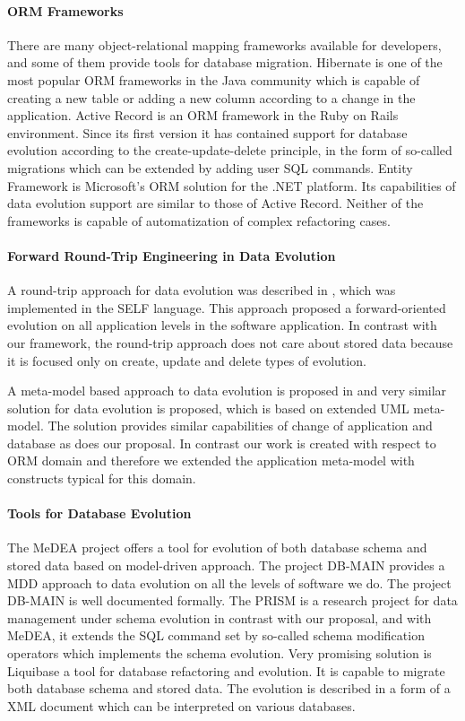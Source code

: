\documentclass[runningheads]{comsis}
\begin{document}
\paragraph{ORM Frameworks} There are many object-relational mapping frameworks available for developers, and some of them provide tools for database migration. Hibernate \cite{Hibernate} is one of the most popular ORM frameworks in the Java community which is capable of creating a new table or adding a new column according to a change in the application. Active Record \cite{Active_Record} is an ORM framework in the Ruby on Rails environment. Since its first version it has contained support for database evolution according to the create-update-delete principle, in the form of so-called migrations \cite{Rails:Migrations} which can be extended by adding user SQL commands. Entity Framework \cite{Entity_Framework} is Microsoft's ORM solution for the .NET platform. Its capabilities of data evolution support are similar to those of Active Record. Neither of the frameworks is capable of automatization of complex refactoring cases.

\paragraph{Forward Round-Trip Engineering in Data Evolution} A round-trip approach for data evolution was described in \cite{VanPaesschen:2005to}, which was implemented in the SELF language. This approach proposed a forward-oriented evolution on all application levels in the software application. In contrast with our framework, the round-trip approach does not care about stored data because it is focused only on create, update and delete types of evolution.

A meta-model based approach to data evolution is proposed in \cite{Aboulsamh:MetaModelBasedApproachToIsDataEvolution} and very similar solution for data evolution is proposed, which is based on extended UML meta-model. The solution provides similar capabilities of change of application and database as does our proposal. In contrast our work is created with respect to ORM domain and therefore we extended the application meta-model with constructs typical for this domain.


\paragraph{Tools for Database Evolution} The MeDEA project \cite{Meda:Main} offers a tool for evolution of both database schema and stored data based on model-driven approach. The project DB-MAIN \cite{Hick:DBMAIN} provides a MDD approach to data evolution on all the levels of software we do. The project DB-MAIN is well documented formally. The PRISM is a research project for data management under schema evolution \cite{PRISM} in contrast with our proposal, and with MeDEA, it extends the SQL command set by so-called schema modification operators which implements the schema evolution.  Very promising solution is Liquibase \cite{Liquibase} a tool for database refactoring and evolution. It is capable to migrate both database schema and stored data. The evolution is described in a form of a XML document which can be interpreted on various databases. 
\end{document}
